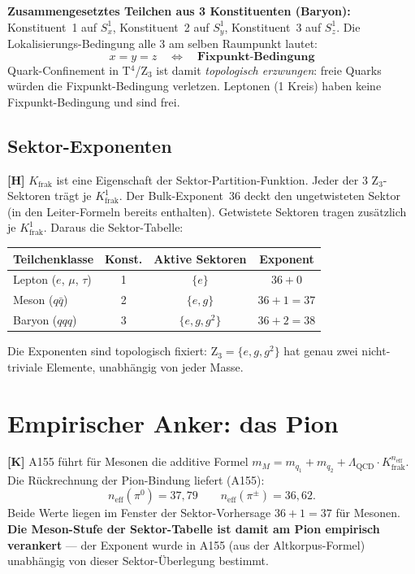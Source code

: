 \textbf{Zusammengesetztes Teilchen aus 3 Konstituenten (Baryon):}
Konstituent~1 auf $S^1_x$, Konstituent~2 auf $S^1_y$,
Konstituent~3 auf $S^1_z$. Die Lokalisierungs-Bedingung
\glqq alle 3 am selben Raumpunkt\grqq{} lautet:
\[
  x = y = z \quad \Leftrightarrow \quad \textbf{Fixpunkt-Bedingung}
\]
Quark-Confinement in T$^4$/Z$_3$ ist damit \emph{topologisch erzwungen}:
freie Quarks würden die Fixpunkt-Bedingung verletzen.
Leptonen (1 Kreis) haben keine Fixpunkt-Bedingung und sind frei.

\subsection{Sektor-Exponenten}

\textbf{[H]} $K_\text{frak}$ ist eine Eigenschaft der
Sektor-Partition-Funktion. Jeder der 3 Z$_3$-Sektoren trägt je
$K_\text{frak}^1$. Der Bulk-Exponent~36 deckt den ungetwisteten Sektor
(in den Leiter-Formeln bereits enthalten). Getwistete Sektoren tragen
zusätzlich je $K_\text{frak}^1$. Daraus die Sektor-Tabelle:

\begin{center}
\renewcommand{\arraystretch}{1.3}
{\small\begin{tabular}{lccc}
\toprule
Teilchenklasse & Konst. & Aktive Sektoren & Exponent \\
\midrule
Lepton ($e$, $\mu$, $\tau$) & 1 & $\{e\}$ & $36+0$ \\
Meson ($q\bar{q}$) & 2 & $\{e, g\}$ & $36+1 = 37$ \\
Baryon ($qqq$) & 3 & $\{e, g, g^2\}$ & $36+2 = 38$ \\
\bottomrule
\end{tabular}}
\renewcommand{\arraystretch}{1.0}
\end{center}

Die Exponenten sind topologisch fixiert: Z$_3 = \{e,g,g^2\}$ hat genau
zwei nicht-triviale Elemente, unabhängig von jeder Masse.

\section{Empirischer Anker: das Pion}

\textbf{[K]} A155 führt für Mesonen die additive Formel
$m_M = m_{q_1} + m_{q_2} + \Lambda_\text{QCD}\cdot
K_\text{frak}^{n_\text{eff}}$. Die Rückrechnung der Pion-Bindung
liefert (A155):
\[
  \boxed{n_\text{eff}(\pi^0) = 37{,}79}
  \qquad n_\text{eff}(\pi^\pm) = 36{,}62.
\]
Beide Werte liegen im Fenster der Sektor-Vorhersage $36+1 = 37$ für
Mesonen. \textbf{Die Meson-Stufe der Sektor-Tabelle ist damit am Pion
empirisch verankert} --- der Exponent wurde in A155 (aus der Altkorpus-Formel) unabhängig von
dieser Sektor-Überlegung bestimmt.

